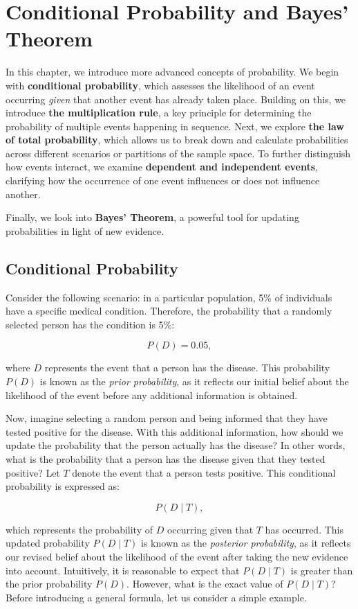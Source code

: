 \chapter{Conditional Probability and Bayes' Theorem}
\label{chap:ch5}

In this chapter, we introduce more advanced concepts of probability. We begin with \textbf{conditional probability}, which assesses the likelihood of an event occurring \textit{given} that another event has already taken place. Building on this, we introduce \textbf{the multiplication rule}, a key principle for determining the probability of multiple events happening in sequence. Next, we explore \textbf{the law of total probability}, which allows us to break down and calculate probabilities across different scenarios or partitions of the sample space. To further distinguish how events interact, we examine \textbf{dependent and independent events}, clarifying how the occurrence of one event influences or does not influence another.

Finally, we look into \textbf{Bayes' Theorem}, a powerful tool for updating probabilities in light of new evidence.

\section{Conditional Probability}
Consider the following scenario: in a particular population, 5\% of individuals have a specific medical condition. Therefore, the probability that a randomly selected person has the condition is 5\%:

\[
P(D) = 0.05,
\]

where \( D \) represents the event that a person has the disease. This probability \( P(D) \) is known as the \textit{prior probability}, as it reflects our initial belief about the likelihood of the event before any additional information is obtained.

Now, imagine selecting a random person and being informed that they have tested positive for the disease. With this additional information, how should we update the probability that the person actually has the disease? In other words, what is the probability that a person has the disease given that they tested positive? Let \( T \) denote the event that a person tests positive. This conditional probability is expressed as:

\[
P(D \mid T),
\]

which represents the probability of \( D \) occurring given that \( T \) has occurred. This updated probability \( P(D \mid T) \) is known as the \textit{posterior probability}, as it reflects our revised belief about the likelihood of the event after taking the new evidence into account. Intuitively, it is reasonable to expect that \( P(D \mid T) \) is greater than the prior probability \( P(D) \). However, what is the exact value of \( P(D \mid T) \)? Before introducing a general formula, let us consider a simple example.

